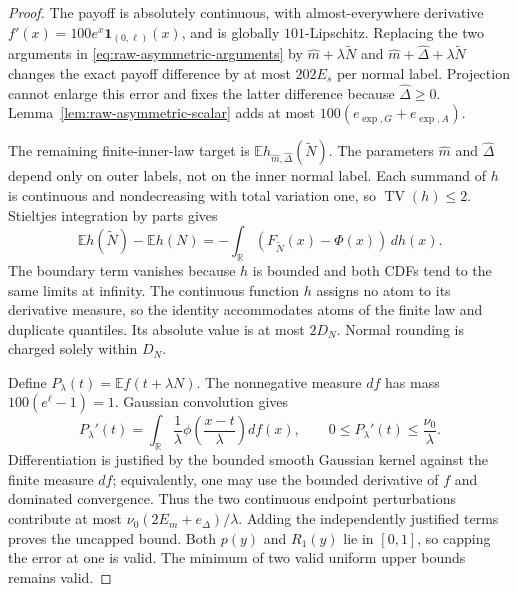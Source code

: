 \documentclass[11pt]{article}
\begin{document}
\begin{proof}
The payoff is absolutely continuous, with almost-everywhere derivative
$f'(x)=100e^x\mathbf1_{(0,\ell)}(x)$, and is globally
$101$-Lipschitz. Replacing the two arguments in
\eqref{eq:raw-asymmetric-arguments} by
$\widehat m+\lambda\widetilde N$ and
$\widehat m+\widehat\Delta+\lambda\widetilde N$ changes the exact
payoff difference by at most $202E_s$ per normal label. Projection
cannot enlarge this error and fixes the latter difference because
$\widehat\Delta\geq0$. Lemma~\ref{lem:raw-asymmetric-scalar}
adds at most $100(e_{\exp,G}+e_{\exp,A})$.

The remaining finite-inner-law target is
$\mathbb E h_{\widehat m,\widehat\Delta}(\widetilde N)$. The
parameters $\widehat m$ and $\widehat\Delta$ depend only on outer
labels, not on the inner normal label. Each summand of $h$ is
continuous and nondecreasing with total variation one, so
$\operatorname{TV}(h)\leq2$. Stieltjes integration by parts gives
\begin{equation}
 \mathbb E h(\widetilde N)-\mathbb E h(N)
   =-\int_{\mathbb R}(F_{\widetilde N}(x)-\Phi(x))\,dh(x).
\end{equation}
The boundary term vanishes because $h$ is bounded and both CDFs tend
to the same limits at infinity. The continuous function $h$ assigns
no atom to its derivative measure, so the identity accommodates
atoms of the finite law and duplicate quantiles. Its absolute value
is at most $2D_N$. Normal rounding is charged solely within $D_N$.

Define $P_\lambda(t)=\mathbb E f(t+\lambda N)$. The nonnegative
measure $df$ has mass
$100(e^\ell-1)=1$. Gaussian convolution gives
\begin{equation}
 P_\lambda'(t)=\int_{\mathbb R}
       \frac1\lambda\phi\left(\frac{x-t}{\lambda}\right)df(x),
 \qquad 0\leq P_\lambda'(t)\leq\frac{\nu_0}{\lambda}.
\end{equation}
Differentiation is justified by the bounded smooth Gaussian kernel
against the finite measure $df$; equivalently, one may use the
bounded derivative of $f$ and dominated convergence. Thus the two
continuous endpoint perturbations contribute at most
$\nu_0(2E_m+e_\Delta)/\lambda$. Adding the independently justified
terms proves the uncapped bound. Both $p(y)$ and $R_1(y)$ lie in
$[0,1]$, so capping the error at one is valid. The minimum of two
valid uniform upper bounds remains valid.
\end{proof}
\end{document}
